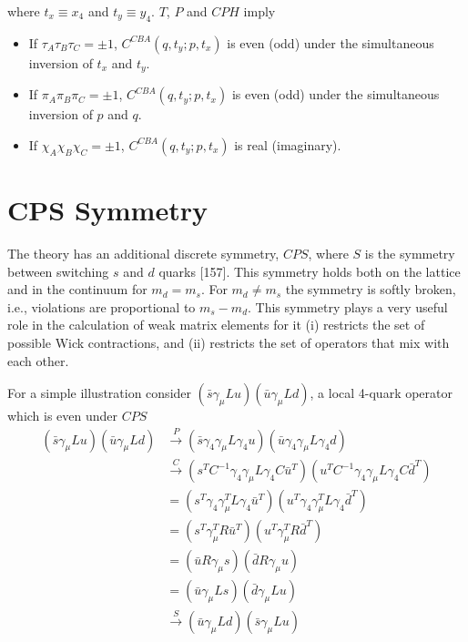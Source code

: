 where $t_x \equiv x_4$ and $t_y \equiv y_4$.  $T$, $P$ and $CPH$ imply
\begin{itemize}
\item If $\tau_A\tau_B\tau_C = \pm 1$, $C^{CBA}(q,t_y;p,t_x)$ is even (odd)
under the simultaneous inversion of $t_x$ and $t_y$.
\item If $\pi_A\pi_B\pi_C = \pm 1$, $C^{CBA}(q,t_y;p,t_x)$ is even (odd) under
the simultaneous inversion of $p$ and $q$.
\item If $\chi_A\chi_B\chi_C = \pm 1$, $C^{CBA}(q,t_y;p,t_x)$ is real
(imaginary).
\end{itemize}

\section{CPS Symmetry}

The theory has an additional discrete symmetry, $CPS$, where $S$ is the
symmetry between switching $s$ and $d$ quarks [157].  This symmetry holds both
on the lattice and in the continuum for $m_d = m_s$.  For $m_d \neq m_s$ the
symmetry is softly broken, i.e., violations are proportional to $m_s - m_d$.
This symmetry plays a very useful role in the calculation of weak matrix
elements for it (i) restricts the set of possible Wick contractions, and (ii)
restricts the set of operators that mix with each other.

For a simple illustration consider $(\bar{s}\gamma_\mu Lu)(\bar{u}\gamma_\mu
Ld)$, a local 4-quark operator which is even under $CPS$
\begin{equation}
\begin{aligned}
(\bar{s}\gamma_\mu Lu)(\bar{u}\gamma_\mu Ld)
&\xrightarrow{P} (\bar{s}\gamma_4\gamma_\mu L\gamma_4 u)(\bar{u}\gamma_4\gamma_\mu L\gamma_4 d)\\
&\xrightarrow{C} (s^T C^{-1}\gamma_4\gamma_\mu L\gamma_4 C\bar{u}^T)(u^T C^{-1}\gamma_4\gamma_\mu L\gamma_4 C\bar{d}^T)\\
&= (s^T\gamma_4\gamma_\mu^T L\gamma_4\bar{u}^T)(u^T\gamma_4\gamma_\mu^T L\gamma_4\bar{d}^T)\\
&= (s^T\gamma_\mu^T R\bar{u}^T)(u^T\gamma_\mu^T R\bar{d}^T)\\
&= (\bar{u}R\gamma_\mu s)(\bar{d}R\gamma_\mu u)\\
&= (\bar{u}\gamma_\mu Ls)(\bar{d}\gamma_\mu Lu)\\
&\xrightarrow{S} (\bar{u}\gamma_\mu Ld)(\bar{s}\gamma_\mu Lu)
\end{aligned}
\end{equation}

